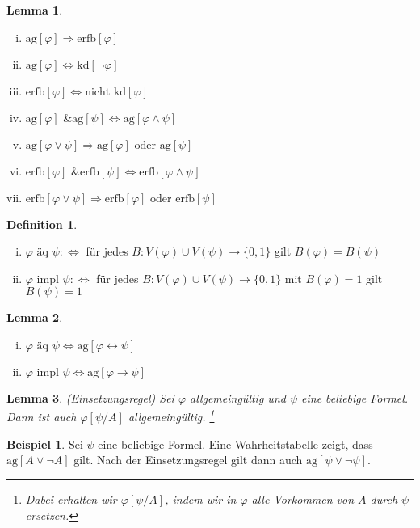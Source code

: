 \documentclass[german,headsepline,fleqn,parskip=half]{scrartcl}
\theoremstyle{definition}
\newtheorem*{dfn}{Definition}
\newtheorem*{ex}{Beispiel}
\theoremstyle{plain}
\newtheorem*{lem}{Lemma}
\newcommand{\ag}[1]{\text{ag}[#1]}
\newcommand{\erfb}[1]{\text{erfb}[#1]}
\newcommand{\kd}[1]{\text{kd}[#1]}
\newcommand{\äq}{\text{ äq }}
\newcommand{\impl}{\text{ impl }}
\begin{document}
	\begin{lem}
		\begin{enumerate}[(i)]
			\item $\ag{\varphi}\Rightarrow\erfb{\varphi}$
			\item $\ag{\varphi}\Leftrightarrow\kd{\lnot\varphi}$
			\item $\erfb{\varphi}\Leftrightarrow\text{nicht }\kd{\varphi}$
			\item $\ag{\varphi}\text{ \& }\ag{\psi}\Leftrightarrow\ag{\varphi\land\psi}$
			\item $\ag{\varphi\lor\psi}\Rightarrow\ag{\varphi}\text{ oder }\ag{\psi}$
			\item $\erfb{\varphi}\text{ \& }\erfb{\psi}\Leftrightarrow\erfb{\varphi\land\psi}$
			\item $\erfb{\varphi\lor\psi}\Rightarrow\erfb{\varphi}\text{ oder }\erfb{\psi}$
		\end{enumerate}
	\end{lem}

	\begin{dfn}
		\begin{enumerate}[(i)]
			\item $\varphi\äq\psi:\Leftrightarrow$ für jedes $B:V(\varphi)\cup V(\psi)\to\{0,1\}$ gilt $B(\varphi)=B(\psi)$
			\item $\varphi\impl\psi:\Leftrightarrow$ für jedes $B:V(\varphi)\cup V(\psi)\to\{0,1\}$ mit $B(\varphi)=1$ gilt $B(\psi)=1$
		\end{enumerate}
	\end{dfn}

	\begin{lem}
		\begin{enumerate}[(i)]
			\item $\varphi\äq\psi\Leftrightarrow\ag{\varphi\leftrightarrow\psi}$
			\item $\varphi\impl\psi\Leftrightarrow\ag{\varphi\rightarrow\psi}$
		\end{enumerate}
	\end{lem}

	\begin{lem}(Einsetzungsregel)
		Sei $\varphi$ allgemeingültig und $\psi$ eine beliebige Formel.
		Dann ist auch $\varphi[\psi/A]$ allgemeingültig.
		\footnote{Dabei erhalten wir $\varphi[\psi/A]$, indem wir in $\varphi$ alle Vorkommen von $A$ durch $\psi$ ersetzen.}
	\end{lem}

	\begin{ex}
		Sei $\psi$ eine beliebige Formel.
		Eine Wahrheitstabelle zeigt, dass $\ag{A\lor\lnot A}$ gilt.
		Nach der Einsetzungsregel gilt dann auch $\ag{\psi\lor\lnot\psi}$.
	\end{ex}
\end{document}
